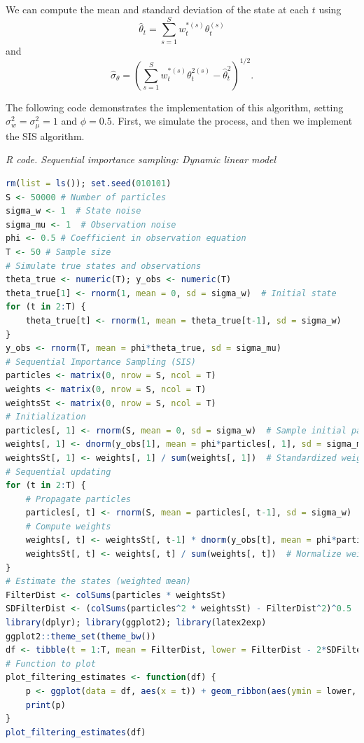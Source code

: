 We can compute the mean and standard deviation of the state at each $t$ using  
\[
\hat{\theta}_t = \sum_{s=1}^S w_t^{*(s)} \theta_t^{(s)}
\]  
and  
\[
\hat{\sigma}_{\theta} = \left(\sum_{s=1}^S w_t^{*(s)} \theta_t^{2(s)} - \hat{\theta}_t^2\right)^{1/2}.
\]  

The following code demonstrates the implementation of this algorithm, setting $\sigma_w^2=\sigma_{\mu}^2=1$ and $\phi=0.5$. First, we simulate the process, and then we implement the SIS algorithm.

\begin{tcolorbox}[enhanced,width=4.67in,center upper,
	fontupper=\large\bfseries,drop shadow southwest,sharp corners]
	\textit{R code. Sequential importance sampling: Dynamic linear model}
	\begin{VF}
		\begin{lstlisting}[language=R]
rm(list = ls()); set.seed(010101)
S <- 50000 # Number of particles
sigma_w <- 1  # State noise
sigma_mu <- 1  # Observation noise
phi <- 0.5 # Coefficient in observation equation
T <- 50 # Sample size
# Simulate true states and observations
theta_true <- numeric(T); y_obs <- numeric(T)
theta_true[1] <- rnorm(1, mean = 0, sd = sigma_w)  # Initial state
for (t in 2:T) {
	theta_true[t] <- rnorm(1, mean = theta_true[t-1], sd = sigma_w)
}
y_obs <- rnorm(T, mean = phi*theta_true, sd = sigma_mu)
# Sequential Importance Sampling (SIS)
particles <- matrix(0, nrow = S, ncol = T) 
weights <- matrix(0, nrow = S, ncol = T) 
weightsSt <- matrix(0, nrow = S, ncol = T) 
# Initialization
particles[, 1] <- rnorm(S, mean = 0, sd = sigma_w)  # Sample initial particles
weights[, 1] <- dnorm(y_obs[1], mean = phi*particles[, 1], sd = sigma_mu)  # Importance weights
weightsSt[, 1] <- weights[, 1] / sum(weights[, 1])  # Standardized weights
# Sequential updating
for (t in 2:T) {
	# Propagate particles
	particles[, t] <- rnorm(S, mean = particles[, t-1], sd = sigma_w)
	# Compute weights
	weights[, t] <- weightsSt[, t-1] * dnorm(y_obs[t], mean = phi*particles[, t], sd = sigma_mu) # Recursive weight update
	weightsSt[, t] <- weights[, t] / sum(weights[, t])  # Normalize weights
}
# Estimate the states (weighted mean)
FilterDist <- colSums(particles * weightsSt)
SDFilterDist <- (colSums(particles^2 * weightsSt) - FilterDist^2)^0.5
library(dplyr); library(ggplot2); library(latex2exp)
ggplot2::theme_set(theme_bw())
df <- tibble(t = 1:T, mean = FilterDist, lower = FilterDist - 2*SDFilterDist, upper = FilterDist + 2*SDFilterDist, theta_true = theta_true)
# Function to plot
plot_filtering_estimates <- function(df) {
	p <- ggplot(data = df, aes(x = t)) + geom_ribbon(aes(ymin = lower, ymax = upper), alpha = 1, fill = "lightblue") + geom_line(aes(y = theta_true), colour = "black", alpha = 1, linewidth = 0.5) + geom_line(aes(y = mean), colour = "blue", linewidth = 0.5) + ylab(TeX("$\\theta_{t}$")) + xlab("Time")
	print(p)
}
plot_filtering_estimates(df)
\end{lstlisting}
	\end{VF}
\end{tcolorbox} 

